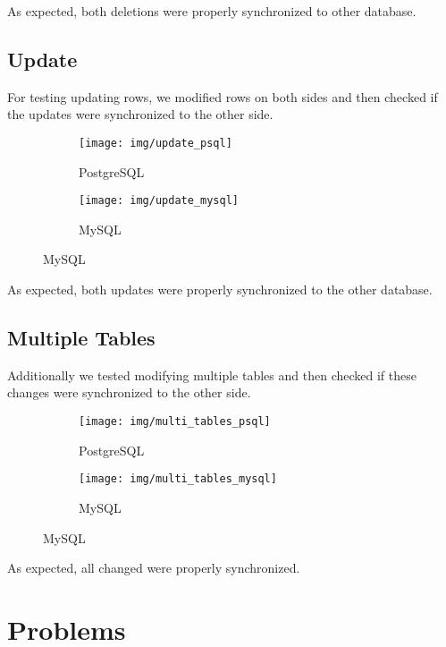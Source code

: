 \documentclass[11pt, a4paper]{article}
\begin{document}
As expected, both deletions were properly synchronized to other database.

\subsection{Update}

For testing updating rows, we modified rows on both sides and then checked if the updates were synchronized to the other side.

\begin{figure}[H]
	\centering
	\begin{subfigure}[b]{0.45\textwidth}
	\centering
		\texttt{[image: img/update\_psql]}
		\caption{PostgreSQL}
	\end{subfigure}
	\begin{subfigure}[b]{0.45\textwidth}
		\centering
		\texttt{[image: img/update\_mysql]}
		\caption{MySQL}
	\end{subfigure}
\end{figure}
\vspace{-10pt}

As expected, both updates were properly synchronized to the other database.

\subsection{Multiple Tables}

Additionally we tested modifying multiple tables and then checked if these changes were synchronized to the other side.

\begin{figure}[H]
	\centering
	\begin{subfigure}[b]{0.45\textwidth}
	\centering
		\texttt{[image: img/multi\_tables\_psql]}
		\caption{PostgreSQL}
	\end{subfigure}
	\begin{subfigure}[b]{0.45\textwidth}
		\centering
		\texttt{[image: img/multi\_tables\_mysql]}
		\caption{MySQL}
	\end{subfigure}
\end{figure}
\vspace{-10pt}

As expected, all changed were properly synchronized.

\section{Problems}
\end{document}
